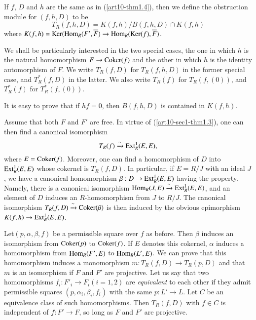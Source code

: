 \begin{definition}\label{art10-sec1-defi1.5}
If $f$, $D$ and $h$ are the same as in (\ref{art10-thm1.4}), then we define the obstruction module for $(f,h,D)$ to be
$$
T_{R}(f,h,D)=K(f,h)/B(f,h,D)\cap K(f,h)
$$
where $K(f,h)=\operatorname{\mathrm{Ker}}(\operatorname{\mathrm{Hom}}_{R}(F',\overline{F})\to \operatorname{\mathrm{Hom}}_{R}(\operatorname{\mathrm{Ker}}(f),\overline{F})$.
\end{definition}

We shall be particularly interested in the two special cases, the one in which $h$ is the natural homomorphism $F\to \operatorname{\mathrm{Coker}} (f)$ and the other in which $h$ is the identity automorphism of $F$. We write $T_{R}(f,D)$ for $T_{R}(f,h,D)$ in the former special case, and $T^{*}_{R}(f,D)$ in the latter. We also write $T_{R}(f)$ for $T_{R}(f,(0))$, and $T^{*}_{R}(f)$ for $T^{*}_{R}(f,(0))$.

\setcounter{subsection}{5}
\setcounter{subsubsection}{0}
\begin{subremark}\label{art10-sec1-rem1.5.1}
It is easy to prove that if $hf=0$, then $B(f,h,D)$ is contained in $K(f,h)$.
\end{subremark}

\begin{subremark}\label{art10-sec1-rem1.5.2}
Assume that both $F$ and $F'$ are free. In virtue of (\ref{art10-sec1-thm1.3}), one can then find a canonical isomorphism
$$
T_{R}(f)\xrightarrow{\sim}\operatorname{\mathrm{Ext}}^{1}_{R}(E,E),
$$
where $E=\operatorname{\mathrm{Coker}} (f)$. Moreover, one can find a homomorphism of $D$ into $\operatorname{\mathrm{Ext}}^{1}_{R}(E,E)$ whose cokernel is $T_{R}(f,D)$. In particular, if $E=R/J$ with an ideal $J$, we have a canonical homomorphism $\beta:D\to \operatorname{\mathrm{Ext}}^{1}_{R}(E,E)$ having the property. Namely, there is a canonical isomorphism $\operatorname{\mathrm{Hom}}_{R}(J,E)\xrightarrow{\sim}\operatorname{\mathrm{Ext}}^{1}_{R}(E,E)$, and an element of $D$ induces an $R$-homomorphism from $J$ to $R/J$. The canonical isomorphism $T_{R}(f,D)\xrightarrow{\sim}\operatorname{\mathrm{Coker}} (\beta)$ is then induced by the obvious epimorphism $K(f,h)\to \operatorname{\mathrm{Ext}}^{1}_{R}(E,E)$.
\end{subremark}

\begin{subremark}\label{art10-sec1-rem1.5.3}
Let\pageoriginale $(p,\alpha,\beta,f)$ be a permissible square over $f$ as before. Then $\beta$ induces an isomorphism from $\operatorname{\mathrm{Coker}} (p)$ to $\operatorname{\mathrm{Coker}}(f)$. If $E$ denotes this cokernel, $\alpha$ induces a homomorphism from $\operatorname{\mathrm{Hom}}_{R}(F',E)$ to $\operatorname{\mathrm{Hom}}_{R}(L',E)$. We can prove that this homomorphism induces a monomorphism $m:T_{R}(f,D)\to T_{R}(p,D)$ and that $m$ is an isomorphism if $F$ and $F'$ are projective. Let us say that two homomorphisms $f_{i}:F'_{i}\to F_{i}(i=1,2)$ are {\em equivalent} to each other if they admit permissible squares $(p,\alpha_{i},\beta_{i},f_{i})$ with the same $p:L'\to L$. Let $C$ be an equivalence class of such homomorphisms. Then $T_{R}(f,D)$ with $f\in C$ is independent of $f:F'\to F$, so long as $F$ and $F'$ are projective.
\end{subremark}

